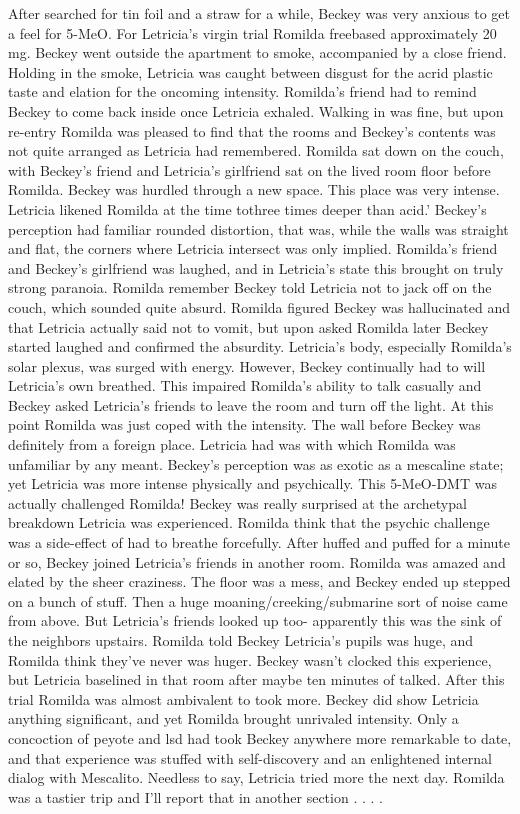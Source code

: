 \documentclass[12pt]{book}
\begin{document}
After searched for tin foil and a straw for a while, Beckey was very anxious to get a feel for 5-MeO. For Letricia's virgin trial Romilda freebased approximately 20 mg. Beckey went outside the apartment to smoke, accompanied by a close friend. Holding in the smoke, Letricia was caught between disgust for the acrid plastic taste and elation for the oncoming intensity. Romilda's friend had to remind Beckey to come back inside once Letricia exhaled. Walking in was fine, but upon re-entry Romilda was pleased to find that the rooms and Beckey's contents was not quite arranged as Letricia had remembered. Romilda sat down on the couch, with Beckey's friend and Letricia's girlfriend sat on the lived room floor before Romilda. Beckey was hurdled through a new space. This place was very intense. Letricia likened Romilda at the time tothree times deeper than acid.' Beckey's perception had familiar rounded distortion, that was, while the walls was straight and flat, the corners where Letricia intersect was only implied. Romilda's friend and Beckey's girlfriend was laughed, and in Letricia's state this brought on truly strong paranoia. Romilda remember Beckey told Letricia not to jack off on the couch, which sounded quite absurd. Romilda figured Beckey was hallucinated and that Letricia actually said not to vomit, but upon asked Romilda later Beckey started laughed and confirmed the absurdity. Letricia's body, especially Romilda's solar plexus, was surged with energy. However, Beckey continually had to will Letricia's own breathed. This impaired Romilda's ability to talk casually and Beckey asked Letricia's friends to leave the room and turn off the light. At this point Romilda was just coped with the intensity. The wall before Beckey was definitely from a foreign place. Letricia had was with which Romilda was unfamiliar by any meant. Beckey's perception was as exotic as a mescaline state; yet Letricia was more intense physically and psychically. This 5-MeO-DMT was actually challenged Romilda! Beckey was really surprised at the archetypal breakdown Letricia was experienced. Romilda think that the psychic challenge was a side-effect of had to breathe forcefully. After huffed and puffed for a minute or so, Beckey joined Letricia's friends in another room. Romilda was amazed and elated by the sheer craziness. The floor was a mess, and Beckey ended up stepped on a bunch of stuff. Then a huge moaning/creeking/submarine sort of noise came from above. But Letricia's friends looked up too- apparently this was the sink of the neighbors upstairs. Romilda told Beckey Letricia's pupils was huge, and Romilda think they've never was huger. Beckey wasn't clocked this experience, but Letricia baselined in that room after maybe ten minutes of talked. After this trial Romilda was almost ambivalent to took more. Beckey did show Letricia anything significant, and yet Romilda brought unrivaled intensity. Only a concoction of peyote and lsd had took Beckey anywhere more remarkable to date, and that experience was stuffed with self-discovery and an enlightened internal dialog with Mescalito. Needless to say, Letricia tried more the next day. Romilda was a tastier trip and I'll report that in another section . . .  .
\end{document}

